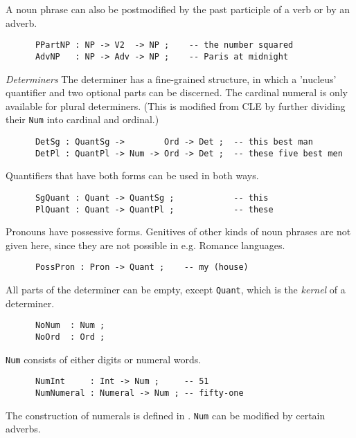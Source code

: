 \documentclass[11pt,a4paper]{article}
\newcommand{\subsubsubsection}[1]{\textit{#1}}
\begin{document}
A noun phrase can also be postmodified by the past participle of a
verb or by an adverb.

\begin{verbatim}
      PPartNP : NP -> V2  -> NP ;    -- the number squared
      AdvNP   : NP -> Adv -> NP ;    -- Paris at midnight
\end{verbatim}

\subsubsubsection{Determiners}
The determiner has a fine-grained structure, in which a 'nucleus'
quantifier and two optional parts can be discerned. 
The cardinal numeral is only available for plural determiners.
(This is modified from CLE by further dividing their \texttt{Num} into 
cardinal and ordinal.)

\begin{verbatim}
      DetSg : QuantSg ->        Ord -> Det ;  -- this best man
      DetPl : QuantPl -> Num -> Ord -> Det ;  -- these five best men
\end{verbatim}

Quantifiers that have both forms can be used in both ways.

\begin{verbatim}
      SgQuant : Quant -> QuantSg ;            -- this
      PlQuant : Quant -> QuantPl ;            -- these
\end{verbatim}

Pronouns have possessive forms. Genitives of other kinds
of noun phrases are not given here, since they are not possible
in e.g. Romance languages.

\begin{verbatim}
      PossPron : Pron -> Quant ;    -- my (house)
\end{verbatim}

All parts of the determiner can be empty, except \texttt{Quant}, which is
the \textit{kernel} of a determiner.

\begin{verbatim}
      NoNum  : Num ;
      NoOrd  : Ord ;
\end{verbatim}

\texttt{Num} consists of either digits or numeral words.

\begin{verbatim}
      NumInt     : Int -> Num ;     -- 51
      NumNumeral : Numeral -> Num ; -- fifty-one
\end{verbatim}

The construction of numerals is defined in .
\texttt{Num} can  be modified by certain adverbs.
\end{document}
